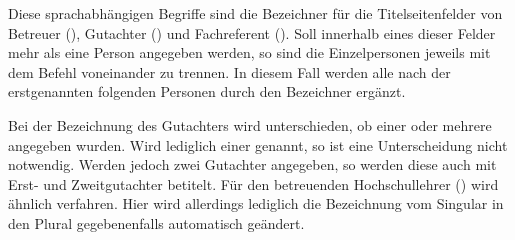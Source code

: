 \begin{Declaration}{}
\begin{Declaration}{}
\begin{Declaration}{}
\begin{Declaration}{}
\begin{Declaration}{}
\begin{Declaration}{}
\begin{Declaration}{}
\begin{Declaration}[v2.02]{}
\printdeclarationlist%
%
%
%
%
Diese sprachabhängigen Begriffe sind die Bezeichner für die Titelseitenfelder 
von Betreuer (), Gutachter () und Fachreferent 
(). Soll innerhalb eines dieser Felder mehr als eine Person 
angegeben werden, so sind die Einzelpersonen jeweils mit dem Befehl  
voneinander zu trennen. In diesem Fall werden alle nach der erstgenannten 
folgenden Personen durch den Bezeichner  ergänzt.

Bei der Bezeichnung des Gutachters wird unterschieden, ob einer oder mehrere 
angegeben wurden. Wird lediglich einer genannt, so ist eine Unterscheidung 
nicht notwendig. Werden jedoch zwei Gutachter angegeben, so werden diese auch 
mit Erst- und Zweitgutachter betitelt. Für den betreuenden Hochschullehrer 
() wird ähnlich verfahren. Hier wird allerdings lediglich 
die Bezeichnung vom Singular in den Plural gegebenenfalls automatisch geändert.


\end{Declaration}
\end{Declaration}
\end{Declaration}
\end{Declaration}
\end{Declaration}
\end{Declaration}
\end{Declaration}
\end{Declaration}

